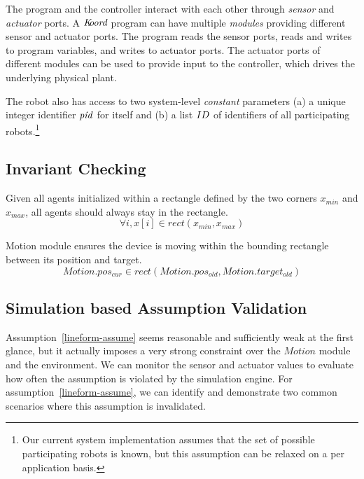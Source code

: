 The program and the controller interact with each other through \emph{sensor} and \emph{actuator} ports.
A $\emph{K\kern-2pt oord}$ program can have multiple \emph{modules} providing different sensor and actuator ports.
The program reads the sensor ports, reads and writes to program variables, and writes to actuator ports.
The actuator ports of different modules can be used to provide input to the controller, which drives the underlying physical plant.


The robot also has access to two system-level \emph{constant} parameters (a) a unique integer identifier $\mathit{pid}$ for itself and (b) a list $ID$ of identifiers of all participating robots.\footnote{Our current system implementation assumes that the set of possible participating robots is known, but this assumption can be relaxed on a per application basis.}


\subsection{Invariant Checking}

\begin{invariant}
Given all agents initialized within a rectangle defined by the two corners $x_{min}$ and $x_{max}$,
all agents should always stay in the rectangle.
\[
\forall i, x[i] \in rect(x_{min}, x_{max})
\]
\end{invariant}


\begin{assumption}\label{lineform-assume}
Motion module ensures the device is moving within the bounding rectangle between its position and target.
\[
Motion.pos_{cur} \in rect(Motion.pos_{old}, Motion.target_{old})
\]
\end{assumption}


\subsection{Simulation based Assumption Validation}

Assumption~\ref{lineform-assume} seems reasonable and sufficiently weak at the first glance,
but it actually imposes a very strong constraint over the $Motion$ module and the environment.
We can monitor the sensor and actuator values to evaluate how often the assumption is violated by the simulation engine.
For assumption~\ref{lineform-assume}, we can identify and demonstrate two common scenarios
where this assumption is invalidated.

